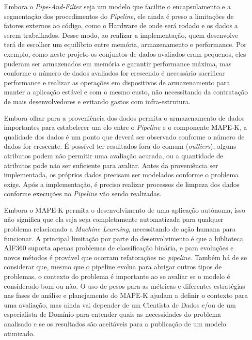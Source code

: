 \documentclass[portugues]{ic-tese}
\begin{document}
Embora o \textit{Pipe-And-Filter} seja um modelo que facilite o encapsulamento e a segmentação dos procedimentos do \textit{Pipeline}, ele ainda é preso a limitações de fatores externos ao código, como o Hardware de onde será rodado e os dados a serem trabalhados. Desse modo, ao realizar a implementação, quem desenvolve terá de escolher um equilíbrio entre memória, armazenamento e performance. Por exemplo, como neste projeto os conjuntos de dados avaliados eram pequenos, eles puderam ser armazenados em memória e garantir performance máxima, mas conforme o número de dados avaliados for crescendo é necessário sacrificar performance e realizar as operações em dispositivos de armazenamento para manter a aplicação estável e com o mesmo custo, não necessitando da contratação de mais desenvolvedores e evitando gastos com infra-estrutura.

Embora olhar para a proveniência dos dados permita o armazenamento de dados importantes para estabelecer um elo entre o \textit{Pipeline} e o componente MAPE-K, a qualidade dos dados é um ponto que deverá ser observado conforme o número de dados for crescente. É possível ter resultados fora do comum (\textit{outliers}), alguns atributos podem não permitir uma avaliação acurada, ou a quantidade de atributos pode não ser suficiente para avaliar. Antes da proveniência ser implementada, os próprios  dados precisam ser modelados conforme o problema exige. Após a implementação, é preciso realizar processos de limpeza dos dados conforme execuções no \textit{Pipeline} vão sendo realizadas.

Embora o MAPE-K permita o desenvolvimento de uma aplicação autônoma, isso não significa que ela seja seja completamente automatizada para qualquer problema relacionado a \textit{Machine Learning}, necessitando de ação humana para funcionar. A principal limitação por parte do desenvolvimento é que a biblioteca AIF360 suporta apenas problemas de classificação binária, e para evoluções e novos métodos é provável que ocorram refatorações no \textit{pipeline}. Também há de se considerar que, mesmo que o pipeline evolua para abrigar outros tipos de problemas, o contexto do problema é importante ao se avaliar se o modelo é considerado bom ou não. O uso de pesos para as métricas e diferentes estratégias nas fases de análise e planejamento do MAPE-K ajudam a definir o contexto para uma avaliação, mas ainda vai depender de um Cientista de Dados e/ou de um especialista de Domínio para entender quais as necessidades do problema analisado e se os resultados são aceitáveis para a publicação de um modelo otimizado.
\end{document}
